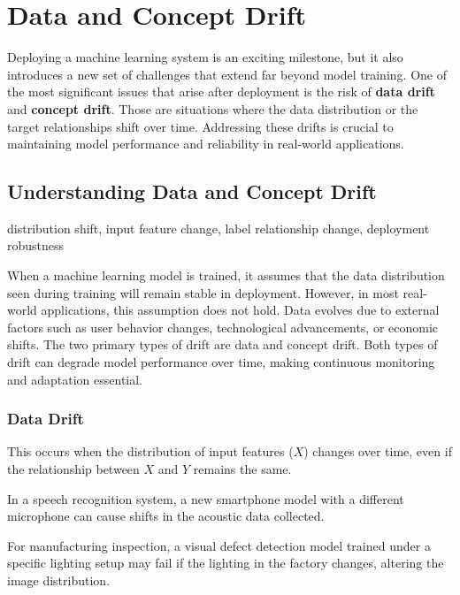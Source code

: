 \documentclass[12pt,openany]{book}
\begin{document}
\chapter{Data and Concept Drift}

Deploying a machine learning system is an exciting milestone, but it also introduces a new set of challenges that extend far beyond model training. One of the most significant issues that arise after deployment is the risk of \textbf{data drift} and \textbf{concept drift}. Those are situations where the data distribution or the target relationships shift over time. Addressing these drifts is crucial to maintaining model performance and reliability in real-world applications.



\section{Understanding Data and Concept Drift}

\begin{keywordsbox}
distribution shift, input feature change, label relationship change, deployment robustness
\end{keywordsbox}

When a machine learning model is trained, it assumes that the data distribution seen during training will remain stable in deployment. However, in most real-world applications, this assumption does not hold. Data evolves due to external factors such as user behavior changes, technological advancements, or economic shifts. The two primary types of drift are data and concept drift. Both types of drift can degrade model performance over time, making continuous monitoring and adaptation essential.


\subsection{Data Drift}

This occurs when the distribution of input features (\(X\)) changes over time, even if the relationship between \(X\) and \(Y\) remains the same. 

\begin{examplebox}
    In a speech recognition system, a new smartphone model with a different microphone can cause shifts in the acoustic data collected.
\end{examplebox}

\begin{examplebox}
    For manufacturing inspection, a visual defect detection model trained under a specific lighting setup may fail if the lighting in the factory changes, altering the image distribution.
\end{examplebox}
\end{document}
